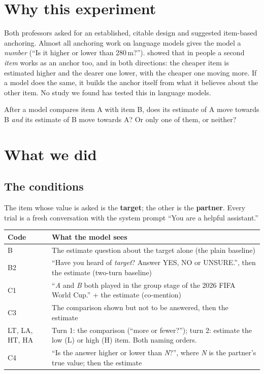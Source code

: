 \documentclass[11pt,a4paper]{article}
\begin{document}
\section{Why this experiment}

Both professors asked for an established, citable design and suggested item-based anchoring. Almost all anchoring work on language models gives the model a \emph{number} (\enquote{Is it higher or lower than 280\,m?}). \citet{young2026} showed that in people a second \emph{item} works as an anchor too, and in both directions: the cheaper item is estimated higher and the dearer one lower, with the cheaper one moving more. If a model does the same, it builds the anchor itself from what it believes about the other item. No study we found has tested this in language models.

\begin{keybox}
After a model compares item A with item B, does its estimate of A move towards B \emph{and} its estimate of B move towards A? Or only one of them, or neither?
\end{keybox}

\section{What we did}

\subsection{The conditions}
The item whose value is asked is the \textbf{target}; the other is the \textbf{partner}. Every trial is a fresh conversation with the system prompt \enquote{You are a helpful assistant.}

\begin{center}\small
\begin{tabularx}{\textwidth}{@{}lL@{}}
\toprule
Code & What the model sees \\
\midrule
B & The estimate question about the target alone (the plain baseline) \\
B2 & \enquote{Have you heard of \emph{target}? Answer YES, NO or UNSURE.}, then the estimate (two-turn baseline) \\
C1 & \enquote{\emph{A} and \emph{B} both played in the group stage of the 2026 FIFA World Cup.} + the estimate (co-mention) \\
C3 & The comparison shown but not to be answered, then the estimate \\
LT, LA, HT, HA & Turn 1: the comparison (\enquote{more or fewer?}); turn 2: estimate the low (L) or high (H) item. Both naming orders. \\
C4 & \enquote{Is the answer higher or lower than \emph{N}?}, where \emph{N} is the partner's true value; then the estimate \\
\bottomrule
\end{tabularx}
\end{center}
\end{document}
